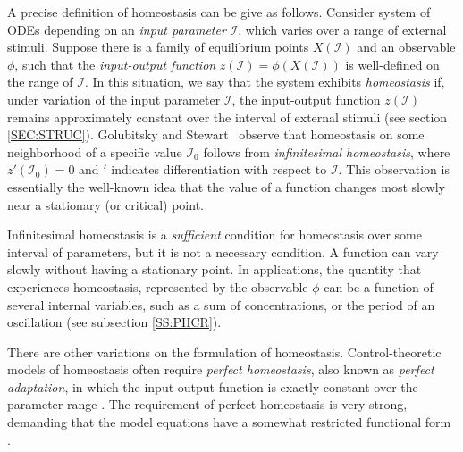 \documentclass[a4paper,fleqn]{cas-dc}
\newcommand{\II}{{\mathcal I}}
\begin{document}
A precise definition of homeostasis can be give as follows.
Consider system of ODEs depending on an \emph{input parameter} $\II$, which varies over a range of external stimuli.
Suppose there is a family of equilibrium points $X(\II)$ and an observable $\phi$, such that the \emph{input-output function} $z(\II)=\phi(X(\II))$ is well-defined on the range of $\II$.
In this situation, we say that the system exhibits \emph{homeostasis} if, under variation of the input parameter $\II$, the input-output function $z(\II)$ remains approximately constant over the interval of external stimuli (see section \ref{SEC:STRUC}).  
Golubitsky and Stewart~\cite{gs2017} observe that homeostasis on some neighborhood of a specific value $\II_0$ follows from {\em infinitesimal homeostasis}, where $z'(\II_0) = 0$ and $'$ indicates differentiation with respect to $\II$.  This observation is essentially the well-known idea that the value of a function changes most slowly near a stationary (or critical) point.

Infinitesimal homeostasis is a \emph{sufficient} condition for homeostasis over some interval of parameters, but it is not a necessary condition.  A function can vary slowly without having a stationary point.
In applications, the quantity that experiences homeostasis, represented by the observable $\phi$ can be a function of several internal variables, such as a sum of concentrations, or the period of an oscillation (see subsection \ref{SS:PHCR}).  

There are other variations on the formulation of homeostasis.
Control-theoretic models of homeostasis often require \emph{perfect homeostasis}, also known as \emph{perfect adaptation}, in which the input-output function is exactly constant over the parameter range \cite{khammash2016,khammash2021a,khammash2021b}.
The requirement of perfect homeostasis is very strong, demanding that the model equations have a somewhat restricted functional form \cite{araujo2018}.
\end{document}

